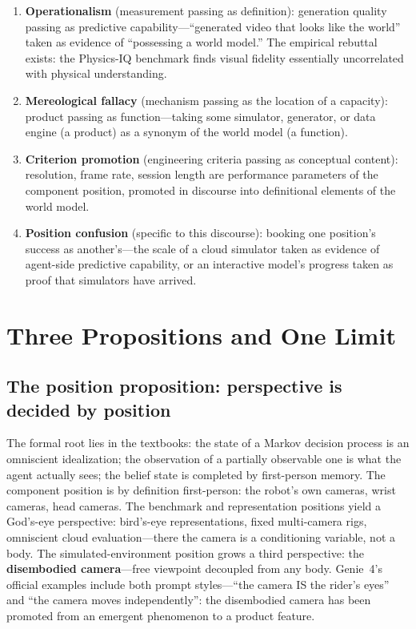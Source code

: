 \documentclass[10pt]{article}
\begin{document}
\begin{enumerate}
\item \textbf{Operationalism} (measurement passing as definition): generation quality passing as predictive capability---``generated video that looks like the world'' taken as evidence of ``possessing a world model.'' The empirical rebuttal exists: the Physics-IQ benchmark finds visual fidelity essentially uncorrelated with physical understanding\cite{motamed2025physicsiq}.
\item \textbf{Mereological fallacy} (mechanism passing as the location of a capacity): product passing as function---taking some simulator, generator, or data engine (a product) as a synonym of the world model (a function).
\item \textbf{Criterion promotion} (engineering criteria passing as conceptual content): resolution, frame rate, session length are performance parameters of the component position, promoted in discourse into definitional elements of the world model.
\item \textbf{Position confusion} (specific to this discourse): booking one position's success as another's---the scale of a cloud simulator taken as evidence of agent-side predictive capability, or an interactive model's progress taken as proof that simulators have arrived.
\end{enumerate}

\section{Three Propositions and One Limit}\label{sec:propositions}

\subsection{The position proposition: perspective is decided by position}\label{sec:positionth}

The formal root lies in the textbooks: the state of a Markov decision process is an omniscient idealization; the observation of a partially observable one is what the agent actually sees; the belief state is completed by first-person memory\cite{sutton2018rl,kaelbling1998pomdp}. The component position is by definition first-person: the robot's own cameras, wrist cameras, head cameras\cite{meta2025vjepa2}. The benchmark and representation positions yield a God's-eye perspective: bird's-eye representations, fixed multi-camera rigs, omniscient cloud evaluation---there the camera is a conditioning variable, not a body\cite{wayve2025gaia2}. The simulated-environment position grows a third perspective: the \textbf{disembodied camera}---free viewpoint decoupled from any body. Genie~4's official examples include both prompt styles---``the camera IS the rider's eyes'' and ``the camera moves independently''\cite{deepmind2026genie4}: the disembodied camera has been promoted from an emergent phenomenon to a product feature.
\end{document}
